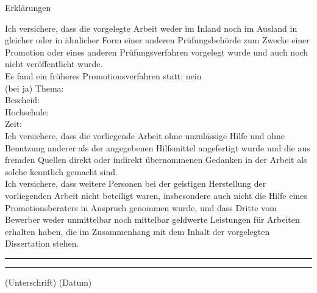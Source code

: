 \documentclass[12pt]{book}
\begin{document}
\thispagestyle{empty}
\textnormal{\large Erklärungen}\\
\vspace*{\fill}

\begingroup

\textnormal{Ich versichere, dass die vorgelegte Arbeit weder im Inland noch im Ausland in gleicher oder in ähnlicher
Form einer anderen Prüfungsbehörde zum Zwecke einer Promotion oder eines anderen Prüfungsverfahren
vorgelegt wurde und auch noch nicht veröffentlicht wurde.}\\[1em]
\textnormal{Es fand ein früheres Promotionsverfahren statt: nein}\\ 
\textnormal{(bei ja) Thema:}\\
\textnormal{Bescheid:}\\
\textnormal{Hochschule:}\\
\textnormal{Zeit:}\\[1em]

\textnormal{Ich versichere, dass die vorliegende Arbeit ohne unzulässige Hilfe und ohne Benutzung anderer als der
angegebenen Hilfsmittel angefertigt wurde und die aus fremden Quellen direkt oder indirekt
übernommenen Gedanken in der Arbeit als solche kenntlich gemacht sind.}\\[1em]
\textnormal{Ich versichere, dass weitere Personen bei der geistigen Herstellung der vorliegenden Arbeit nicht beteiligt
waren, insbesondere auch nicht die Hilfe eines Promotionsberaters in Anspruch genommen wurde, und
dass Dritte vom Bewerber weder unmittelbar noch mittelbar geldwerte Leistungen für Arbeiten erhalten
haben, die im Zusammenhang mit dem Inhalt der vorgelegten Dissertation stehen.}\\


\centering

\hspace{3em}



\vspace{8em}

\rule[1em]{10em}{0.5pt} %
\hspace*{\fill}
\rule[1em]{10em}{0.5pt}

\textnormal{(Unterschrift) \hspace*{\fill} (Datum)}
 



\endgroup
\vspace*{\fill}


\end{document}
